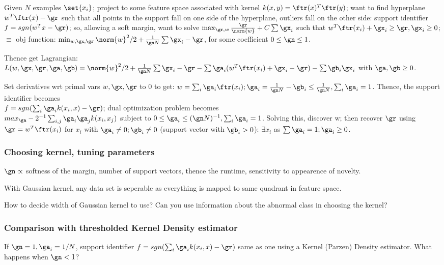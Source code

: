 \documentclass[oneside, article]{memoir}
\begin{document}
Given $N$ examples $\set{x_{i}}$; project to some feature space associated with kernel $k(x,y) = \ftr(x)^{T}\ftr(y)$; want to find hyperplane $w^{T}\ftr(x) - \gr$ such that all points in the support fall on one side of the hyperplane, outliers fall on the other side: support identifier $f = sgn(w^{T}x - \gr)$; so, allowing a soft margin, want to solve $\max_{\gr, w} \frac{\gr}{\norm{w}} + C\sum \gx_{i}$ such that $w^{T}\ftr(x_{i}) + \gx_{i} \geq \gr, \gx_{i} \geq 0$; $\equiv$ obj function: $\min_{w, \gx, \gr} \norm{w}^{2}/2 + \frac{1}{\gn N} \sum \gx_{i} - \gr$, for some coefficient $0 \leq \gn \leq 1$.

Thence get Lagrangian: \\
$L(w, \gx, \gr, \ga, \gb) =  \norm{w}^{2}/2 + \frac{1}{\gn N} \sum \gx_{i} - \gr - \sum \ga_{i}(w^{T}\ftr(x_{i}) + \gx_{i} - \gr) - \sum \gb_{i}\gx_{i}$ with $\ga, \gb \geq 0$.

Set derivatives wrt primal vars $w, \gx, \gr$ to 0 to get: $w = \sum_{i}\ga_{i}\ftr(x_{i}); \ga_{i} = \frac{1}{\gn N} - \gb_{i} \leq \frac{1}{\gn N}, \sum_{i} \ga_{i} = 1$. Thence, the support identifier becomes \\
$f = sgn(\sum_{i}\ga_{i}k(x_{i},x) - \gr)$; dual optimization problem becomes \\
$max_{\ga} - 2^{-1} \sum_{i,j}\ga_{i}\ga_{j}k(x_{i}, x_{j})$ subject to $0 \leq \ga_{i} \leq (\gn N)^{-1}, \sum_{i}\ga_{i} =1$. Solving this, discover w; then recover $\gr$ using $\gr = w^{T}\ftr(x_{i})$ for $x_{i}$ with $\ga_{i} \neq 0; \gb_{i} \neq 0$ (support vector with $\gb_{i} > 0$): $\exists x_{i}$ as $\sum \ga_{i} = 1; \ga_{i} \geq 0$.

\subsubsection{Choosing kernel, tuning parameters}
$\gn \propto$ softness of the margin, number of support vectors, thence the runtime, sensitivity to appearence of novelty.

With Gaussian kernel, any data set is seperable as everything is mapped to same quadrant in feature space.

\oprob How to decide width of Gaussian kernel to use? Can you use information about the abnormal class in choosing the kernel?

\subsubsection{Comparison with thresholded Kernel Density estimator}
If $\gn = 1, \ga_{i} = 1/N$, support identifier $f = sgn(\sum_{i}\ga_{i}k(x_{i},x) - \gr)$ same as one using a Kernel (Parzen) Density estimator. What happens when $\gn < 1$?
\end{document}
